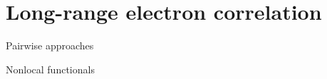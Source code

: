 \chapter{Long-range electron correlation}\label{chap:vdw-methods}

\citet{HermannCR17}

Pairwise approaches
\citet{EisenschitzZP30}
\citet{HepburnCPL75}
\citet{HalgrenJACS92}
\citet{MooijJPCA99}
\citet{ElstnerJCP01}
\citet{WuJCP02}
\citet{GrimmeJCC04}

Nonlocal functionals
\citet{LangrethPRB77}
\citet{HultPRL96}
\citet{AnderssonPRL96}
\citet{KohnPRL98}
\citet{HultPRB99}
\citet{Dion04}
\citet{DionPRL04}
